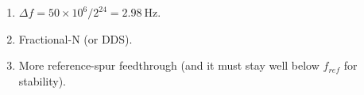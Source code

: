 \begin{enumerate}[leftmargin=1.6em,itemsep=2pt]
\item $\Delta f = 50\times10^{6}/2^{24} = 2.98\ \text{Hz}$.
\item Fractional-N (or DDS).
\item More reference-spur feedthrough (and it must stay well below $f_{ref}$ for stability).
\end{enumerate}
